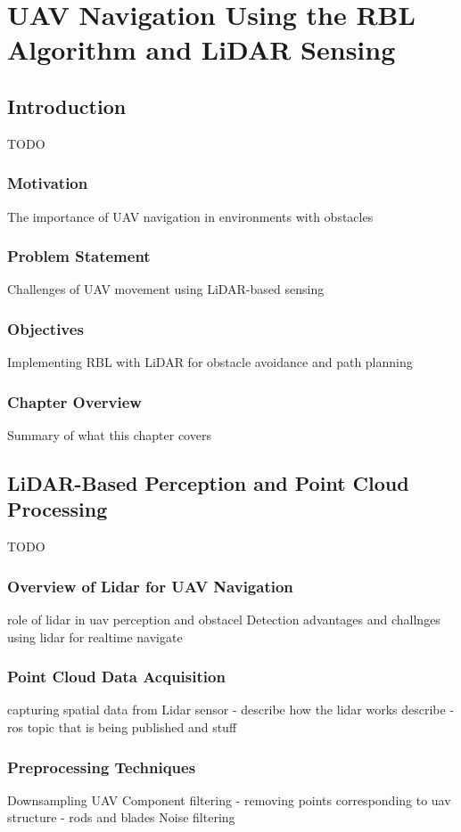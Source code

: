\chapter{UAV Navigation Using the RBL Algorithm and LiDAR Sensing\label{chap:lidar}}

    \section{Introduction}
        TODO
        \subsection{Motivation}
            The importance of UAV navigation in environments with obstacles
        \subsection{Problem Statement}
            Challenges of UAV movement using LiDAR-based sensing
        \subsection{Objectives}
            Implementing RBL with LiDAR for obstacle avoidance and path planning
        \subsection{Chapter Overview}
            Summary of what this chapter covers

    \section{LiDAR-Based Perception and Point Cloud Processing}
        TODO
        \subsection{Overview of Lidar for UAV Navigation}
            role of lidar in uav perception and obstacel Detection
            advantages and challnges using lidar for realtime navigate
        \subsection{Point Cloud Data Acquisition}
            capturing spatial data from Lidar sensor - describe how the lidar works
            describe - ros topic that is being published and stuff
        \subsection{Preprocessing Techniques}
            Downsampling
            UAV Component filtering - removing points corresponding to uav structure - rods and blades
            Noise filtering
